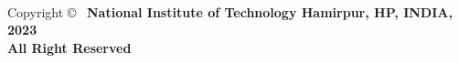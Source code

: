 ~
\vspace{8cm}
%


\begin{center}
	Copyright \copyright~ \textbf{National Institute of Technology Hamirpur, HP, INDIA, 2023}\\
	\textbf{All Right Reserved}
\end{center}